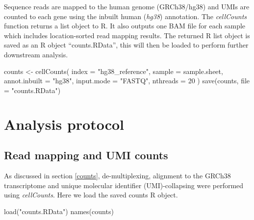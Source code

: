 \documentclass[
  openany]{book}
\newenvironment{Shaded}{\begin{snugshade}}{\end{snugshade}}
\newcommand{\AttributeTok}[1]{\textcolor[rgb]{0.77,0.63,0.00}{#1}}
\newcommand{\DecValTok}[1]{\textcolor[rgb]{0.00,0.00,0.81}{#1}}
\newcommand{\FunctionTok}[1]{\textcolor[rgb]{0.00,0.00,0.00}{#1}}
\newcommand{\NormalTok}[1]{#1}
\newcommand{\OtherTok}[1]{\textcolor[rgb]{0.56,0.35,0.01}{#1}}
\newcommand{\StringTok}[1]{\textcolor[rgb]{0.31,0.60,0.02}{#1}}
\begin{document}
Sequence reads are mapped to the human genome (GRCh38/hg38) and UMIs are counted to each gene using the inbuilt human (\emph{hg38}) annotation. The \emph{cellCounts} function returns a list object to R. It also outputs one BAM file for each sample which includes location-sorted read mapping results. The returned R list object is saved as an R object ``counts.RData'', this will then be loaded to perform further downstream analysis.

\begin{Shaded}
\begin{Highlighting}[]
\NormalTok{counts }\OtherTok{\textless{}{-}}
  \FunctionTok{cellCounts}\NormalTok{(}
    \AttributeTok{index =} \StringTok{"hg38\_reference"}\NormalTok{,}
    \AttributeTok{sample =}\NormalTok{ sample.sheet,}
    \AttributeTok{annot.inbuilt =} \StringTok{"hg38"}\NormalTok{,}
    \AttributeTok{input.mode =} \StringTok{"FASTQ"}\NormalTok{,}
    \AttributeTok{nthreads =} \DecValTok{20}
\NormalTok{  )}
\FunctionTok{save}\NormalTok{(counts, }\AttributeTok{file =} \StringTok{"counts.RData"}\NormalTok{)}
\end{Highlighting}
\end{Shaded}

\vspace{-100pt}

\hypertarget{analysis-protocol}{%
\chapter{Analysis protocol}\label{analysis-protocol}}

\hypertarget{read-mapping-and-umi-counts}{%
\section{Read mapping and UMI counts}\label{read-mapping-and-umi-counts}}

As discussed in section \ref{counts}, de-multiplexing, alignment to the GRCh38 transcriptome and unique molecular identifier (UMI)-collapsing were performed using \emph{cellCounts}. Here we load the saved counts R object.

\begin{Shaded}
\begin{Highlighting}[]
\FunctionTok{load}\NormalTok{(}\StringTok{"counts.RData"}\NormalTok{)}
\FunctionTok{names}\NormalTok{(counts)}
\end{Highlighting}
\end{Shaded}
\end{document}
